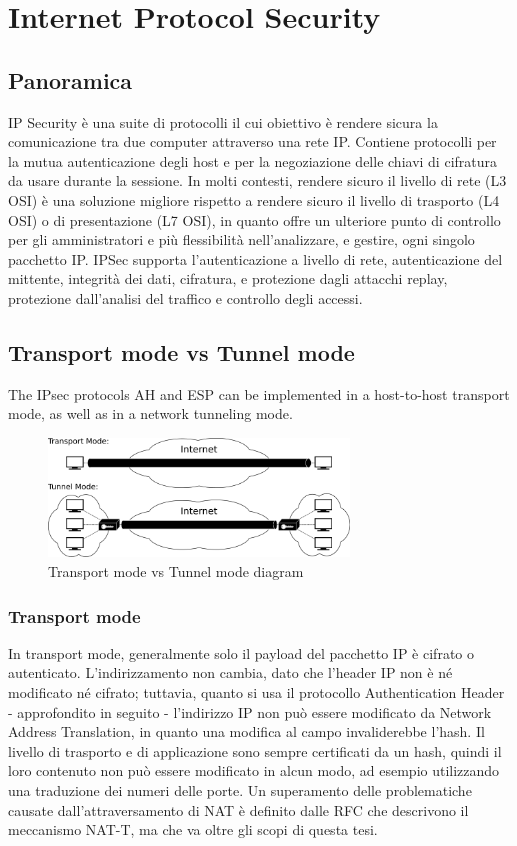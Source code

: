 \section{Internet Protocol Security}
\subsection{Panoramica}
IP Security è una suite di protocolli il cui obiettivo è rendere sicura la comunicazione tra due computer attraverso una rete IP.
Contiene protocolli per la mutua autenticazione degli host e per la negoziazione delle chiavi di cifratura da usare durante la sessione.
In molti contesti, rendere sicuro il livello di rete (L3 OSI) è una soluzione migliore rispetto a rendere sicuro il livello di trasporto (L4 OSI) o di presentazione (L7 OSI), in quanto offre un ulteriore punto di controllo per gli amministratori e più flessibilità nell'analizzare, e gestire, ogni singolo pacchetto IP.
IPSec supporta l'autenticazione a livello di rete, autenticazione del mittente, integrità dei dati, cifratura, e protezione dagli attacchi replay, protezione dall'analisi del traffico e controllo degli accessi.

\subsection{Transport mode vs Tunnel mode}
The IPsec protocols AH and ESP can be implemented in a host-to-host transport mode, as well as in a network tunneling mode.

\begin{figure}[ht]
    \centering
    \includegraphics[width=8cm]{figure/ipsec_modes.png}
    \caption{Transport mode vs Tunnel mode diagram}
\end{figure}


\subsubsection{Transport mode}
In transport mode, generalmente solo il payload del pacchetto IP è cifrato o autenticato. L'indirizzamento non cambia, dato che l'header IP non è né modificato né cifrato; tuttavia, quanto si usa il protocollo Authentication Header - approfondito in seguito - l'indirizzo IP non può essere modificato da Network Address Translation, in quanto una modifica al campo invaliderebbe l'hash. Il livello di trasporto e di applicazione sono sempre certificati da un hash, quindi il loro contenuto non può essere modificato in alcun modo, ad esempio utilizzando una traduzione dei numeri delle porte.
Un superamento delle problematiche causate dall'attraversamento di NAT è definito dalle RFC che descrivono il meccanismo NAT-T, ma che va oltre gli scopi di questa tesi.

